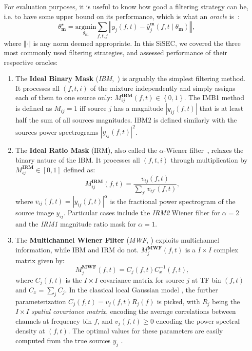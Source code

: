 \documentclass{article}
\newcommand{\sboxed}[1]{\textbf{#1}}
\newcommand{\thet}[1]{\theta_{\sboxed{#1}}}
\newcommand{\ft}{\left(f,t\right)}
\newcommand{\ftt}[1]{\left(f,t\mid\thet{#1}\right)}
\begin{document}
For evaluation purposes, it is useful to know how good a filtering strategy can be, i.e. to have some upper bound on its performance, which is what an \textit{oracle} is~\cite{vincent2007oracle}:
\begin{equation}
  \thet{m}^{\star}=\underset{\thet{m}}{\text{argmin}}\sum_{f,t,j}\left\Vert y_{j}\ft-\hat{y}_{j}^{\sboxed{m}}\ftt{m}\right\Vert,
  \end{equation}
where $\Vert\cdot\Vert$ is any norm deemed appropriate. In this SiSEC, we covered the three most commonly used filtering strategies, and assessed performance of their respective oracles:
\begin{enumerate}
  \item The \textbf{Ideal Binary Mask} (\textit{IBM},~\cite{wang2005}) is arguably the simplest filtering method. It processes all $\left(f,t,i\right)$ of the mixture independently and simply assigns each of them to one source only:   $M_{ij}^\sboxed{IBM}\ft\in\left\{0,1\right\}$. The IMB1 method is defined as $M_{ij}=1$ iff source $j$ has a magnitude $\left|y_{ij}(f,t)\right|$ that is at least half the sum of all sources magnitudes. IBM2 is defined similarly with the sources power spectrograms $\left|y_{ij}(f,t)\right|^2$.
  \item The \textbf{Ideal Ratio Mask} (IRM), also called the $\alpha$-Wiener filter~\cite{liutkus15}, relaxes the binary nature of the IBM. It processes all $\left(f,t,i\right)$ through multiplication by $M_{ij}^\sboxed{IRM}\in\left[0,1\right]$ defined as:
  \begin{equation}
    M^{\sboxed{IRM}}_{ij}\ft=\frac{v_{ij}\ft}{\sum_{j'}v_{ij'}\ft},
  \end{equation}
where $v_{ij}\ft=\left|y_{ij}\ft\right|^\alpha$ is the fractional power spectrogram of the source image $y_{ij}$. Particular cases include the \textit{IRM2} Wiener filter for $\alpha=2$ and the \textit{IRM1} magnitude ratio mask for $\alpha=1$.
  \item The \textbf{Multichannel Wiener Filter} (\textit{MWF}, \cite{duong10}) exploits multichannel information, while IBM and IRM do not. $M^{\sboxed{MWF}}_{j}\ft$ is a $I\times I$ complex matrix given by:
  \begin{equation}
    M_{j}^{\sboxed{MWF}}\ft=C_{j}\ft C_{x}^{-1}\ft,
  \end{equation}
where $C_j\ft$ is the $I\times I$ covariance matrix for source $j$ at TF bin $\ft$ and $C_x=\sum_j C_j$. In the classical local Gaussian model \cite{duong10}, the further parameterization $C_j\ft=v_j\ft R_j\left(f\right)$ is picked, with $R_j$ being the $I\times I$ \textit{spatial covariance matrix}, encoding the average correlations between channels at frequency bin $f$, and $v_j\ft\geq0$ encoding the power spectral density at $\ft$. The optimal values for these parameters are easily computed from the true sources $y_j$ \cite{liutkus2013}.
\end{enumerate}
\end{document}
